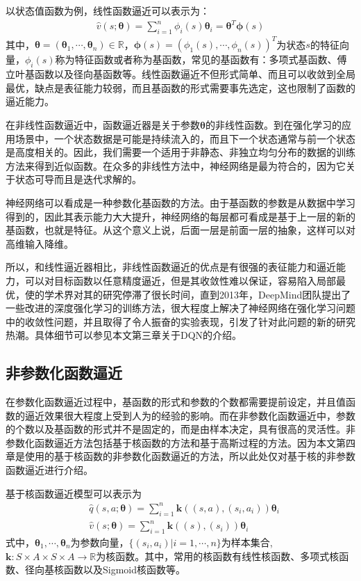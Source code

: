 以状态值函数为例，线性函数逼近可以表示为：
\begin{equation}
\begin{aligned}
\hat{v}(s;\bm{\theta})=\sum^{n}_{i=1}\phi_{i}(s) \bm{\theta}_{i}=\bm{\theta }^{T} \bm{\phi}(s)
\end{aligned}
\end{equation}
其中，$\bm{\theta}=(\bm{\theta}_{1},\cdots,\bm{\theta}_{n}) \in \mathbb{R}$，$\bm{\phi}(s)=(\phi_{1}(s),\cdots,\phi_{n}(s))^{T}$为状态$s$的特征向量，$\phi_{i}(s)$称为特征函数或者称为基函数，常见的基函数有：多项式基函数、傅立叶基函数以及径向基函数等。线性函数逼近不但形式简单、而且可以收敛到全局最优，缺点是表征能力较弱，而且基函数的形式需要事先选定，这也限制了函数的逼近能力。

在非线性函数逼近中，函数逼近器是关于参数$\bm{\theta}$的非线性函数。到在强化学习的应用场景中，一个状态数据是可能是持续流入的，而且下一个状态通常与前一个状态是高度相关的。因此，我们需要一个适用于非静态、非独立均匀分布的数据的训练方法来得到近似函数。在众多的非线性方法中，神经网络是最为符合的，因为它关于状态可导而且是迭代求解的。

神经网络可以看成是一种参数化基函数的方法。由于基函数的参数是从数据中学习得到的，因此其表示能力大大提升，神经网络的每层都可看成是基于上一层的新的基函数，也就是特征。从这个意义上说，后面一层是前面一层的抽象，这样可以对高维输入降维。

所以，和线性逼近器相比，非线性函数逼近的优点是有很强的表征能力和逼近能力，可以对目标函数以任意精度逼近，但是其收敛性难以保证，容易陷入局部最优，使的学术界对其的研究停滞了很长时间，直到2013年，DeepMind团队提出了一些改进的深度强化学习的训练方法，很大程度上解决了神经网络在强化学习问题中的收敛性问题，并且取得了令人振奋的实验表现，引发了针对此问题的新的研究热潮。具体细节可以参见本文第三章关于DQN的介绍。

\subsection{非参数化函数逼近}
在参数化函数逼近过程中，基函数的形式和参数的个数都需要提前设定，并且值函数的逼近效果很大程度上受到人为的经验的影响。而在非参数化函数逼近中，参数的个数以及基函数的形式并不是固定的，而是由样本决定，具有很高的灵活性。非参数化函数逼近方法包括基于核函数的方法和基于高斯过程的方法。因为本文第四章是使用的基于核函数的非参数化函数逼近的方法，所以此处仅对基于核的非参数函数逼近进行介绍。

基于核函数逼近模型可以表示为
\begin{equation}
\begin{aligned}
&\hat{q}(s,a;\bm{\theta})=\sum^{n}_{i=1}\bm{k}((s,a),(s_{i},a_{i}))\bm{\theta}_{i}\\
&\hat{v}(s;\bm{\theta})=\sum^{n}_{i=1}\bm{k}((s),(s_{i}))\bm{\theta}_{i}
\end{aligned}
\end{equation}
式中，$\bm{\theta}_{1},\cdots,\bm{\theta}_{n}$为参数向量，$\{(s_{i},a_{i})|i=1,\cdots,n\}$为样本集合,$\bm{k}:S\times A \times S \times A \to \mathbb{R} $为核函数。其中，常用的核函数有线性核函数、多项式核函数、径向基核函数以及Sigmoid核函数等。

